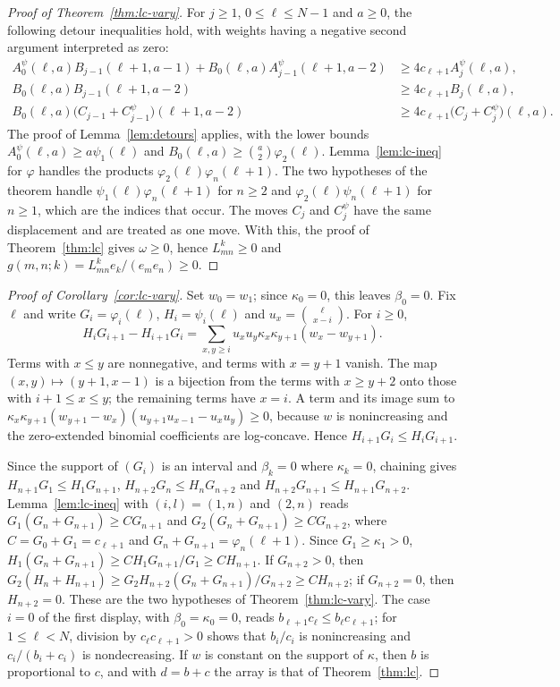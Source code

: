 \begin{proof}[Proof of Theorem~\ref{thm:lc-vary}]
For $j\geq1$, $0\leq\ell\leq N-1$ and $a\geq0$, the following detour inequalities hold, with weights having a negative second argument interpreted as zero:
\[
\begin{aligned}
A^\psi_0(\ell,a)B_{j-1}(\ell+1,a-1)+B_0(\ell,a)A^\psi_{j-1}(\ell+1,a-2)&\geq4c_{\ell+1}A^\psi_j(\ell,a),\\
B_0(\ell,a)B_{j-1}(\ell+1,a-2)&\geq4c_{\ell+1}B_j(\ell,a),\\
B_0(\ell,a)\bigl(C_{j-1}+C^\psi_{j-1}\bigr)(\ell+1,a-2)&\geq4c_{\ell+1}\bigl(C_j+C^\psi_j\bigr)(\ell,a).
\end{aligned}
\]
The proof of Lemma~\ref{lem:detours} applies, with the lower bounds $A^\psi_0(\ell,a)\geq a\psi_1(\ell)$ and $B_0(\ell,a)\geq\binom a2\varphi_2(\ell)$. Lemma~\ref{lem:lc-ineq} for $\varphi$ handles the products $\varphi_2(\ell)\varphi_n(\ell+1)$. The two hypotheses of the theorem handle $\psi_1(\ell)\varphi_n(\ell+1)$ for $n\geq2$ and $\varphi_2(\ell)\psi_n(\ell+1)$ for $n\geq1$, which are the indices that occur. The moves $C_j$ and $C^\psi_j$ have the same displacement and are treated as one move. With this, the proof of Theorem~\ref{thm:lc} gives $\omega\geq0$, hence $L_{mn}^k\geq0$ and $g(m,n;k)=L_{mn}^ke_k/(e_me_n)\geq0$.
\end{proof}

\begin{proof}[Proof of Corollary~\ref{cor:lc-vary}]
Set $w_0=w_1$; since $\kappa_0=0$, this leaves $\beta_0=0$. Fix $\ell$ and write $G_i=\varphi_i(\ell)$, $H_i=\psi_i(\ell)$ and $u_x=\binom\ell{x-i}$. For $i\geq0$,
\[
H_iG_{i+1}-H_{i+1}G_i=\sum_{x,y\geq i}u_xu_y\kappa_x\kappa_{y+1}(w_x-w_{y+1}).
\]
Terms with $x\leq y$ are nonnegative, and terms with $x=y+1$ vanish. The map $(x,y)\mapsto(y+1,x-1)$ is a bijection from the terms with $x\geq y+2$ onto those with $i+1\leq x\leq y$; the remaining terms have $x=i$. A term and its image sum to $\kappa_x\kappa_{y+1}(w_{y+1}-w_x)(u_{y+1}u_{x-1}-u_xu_y)\geq0$, because $w$ is nonincreasing and the zero-extended binomial coefficients are log-concave. Hence $H_{i+1}G_i\leq H_iG_{i+1}$.

Since the support of $(G_i)$ is an interval and $\beta_k=0$ where $\kappa_k=0$, chaining gives $H_{n+1}G_1\leq H_1G_{n+1}$, $H_{n+2}G_n\leq H_nG_{n+2}$ and $H_{n+2}G_{n+1}\leq H_{n+1}G_{n+2}$. Lemma~\ref{lem:lc-ineq} with $(i,l)=(1,n)$ and $(2,n)$ reads $G_1(G_n+G_{n+1})\geq CG_{n+1}$ and $G_2(G_n+G_{n+1})\geq CG_{n+2}$, where $C=G_0+G_1=c_{\ell+1}$ and $G_n+G_{n+1}=\varphi_n(\ell+1)$. Since $G_1\geq\kappa_1>0$, $H_1(G_n+G_{n+1})\geq C H_1G_{n+1}/G_1\geq CH_{n+1}$. If $G_{n+2}>0$, then $G_2(H_n+H_{n+1})\geq G_2H_{n+2}(G_n+G_{n+1})/G_{n+2}\geq CH_{n+2}$; if $G_{n+2}=0$, then $H_{n+2}=0$. These are the two hypotheses of Theorem~\ref{thm:lc-vary}. The case $i=0$ of the first display, with $\beta_0=\kappa_0=0$, reads $b_{\ell+1}c_\ell\leq b_\ell c_{\ell+1}$; for $1\leq\ell<N$, division by $c_\ell c_{\ell+1}>0$ shows that $b_i/c_i$ is nonincreasing and $c_i/(b_i+c_i)$ is nondecreasing. If $w$ is constant on the support of $\kappa$, then $b$ is proportional to $c$, and with $d=b+c$ the array is that of Theorem~\ref{thm:lc}.
\end{proof}

